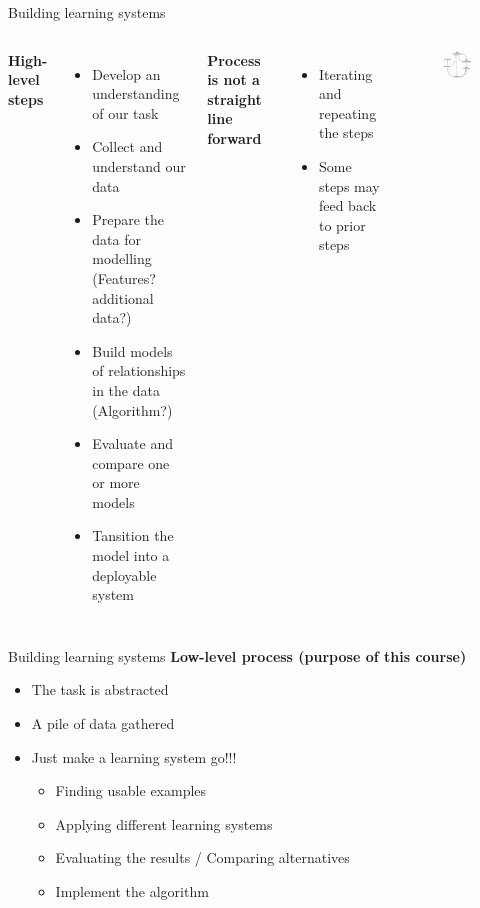 \documentclass{beamer}
\begin{document}
\begin{frame}{Building learning systems}
\begin{columns}
\textbf{High-level steps}
\begin{itemize}
\item Develop an understanding of our task
\item Collect and understand our data
\item Prepare the data for modelling (Features? additional data?)
\item Build models of relationships in the data (Algorithm?)
\item Evaluate and compare one or more models
\item Tansition the model into a deployable system
\end{itemize}
\vspace{6pt}
\textbf{Process is not a straight line forward}
\begin{itemize}
\item Iterating and repeating the steps
\item Some steps may feed back to prior steps
\end{itemize}
\begin{figure}
\centering
\includegraphics[width=3cm]{ep10.jpeg}
\end{figure}
\end{columns}
\end{frame}

\begin{frame}{Building learning systems}
\textbf{Low-level process (purpose of this course)}
\begin{itemize}
\item The task is abstracted
\item A pile of data gathered
\item Just make a learning system go!!!
\begin{itemize}
\item Finding usable examples
\item Applying different learning systems
\item Evaluating the results / Comparing alternatives
\item Implement the algorithm
\end{itemize}
\end{itemize}
\end{frame}
\end{document}
